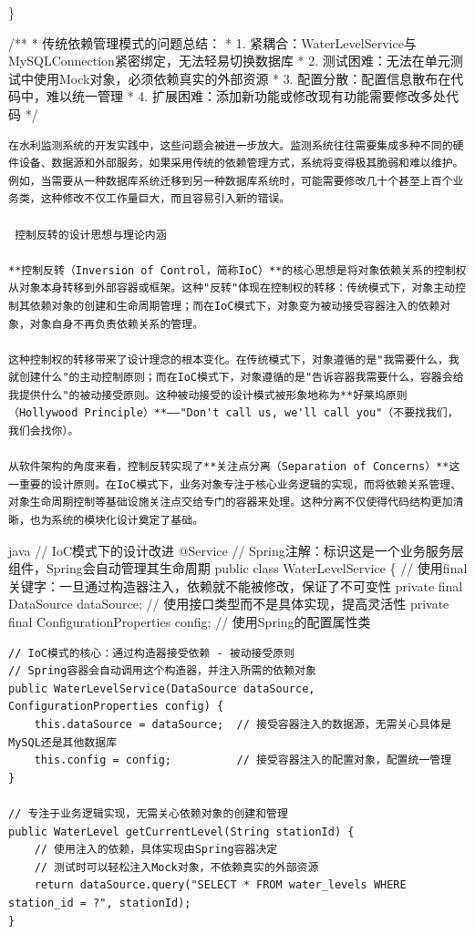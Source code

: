 \}

/** * 传统依赖管理模式的问题总结： * 1. 紧耦合：WaterLevelService与MySQLConnection紧密绑定，无法轻易切换数据库 * 2. 测试困难：无法在单元测试中使用Mock对象，必须依赖真实的外部资源 * 3. 配置分散：配置信息散布在代码中，难以统一管理 * 4. 扩展困难：添加新功能或修改现有功能需要修改多处代码 */

\begin{lstlisting}
在水利监测系统的开发实践中，这些问题会被进一步放大。监测系统往往需要集成多种不同的硬件设备、数据源和外部服务，如果采用传统的依赖管理方式，系统将变得极其脆弱和难以维护。例如，当需要从一种数据库系统迁移到另一种数据库系统时，可能需要修改几十个甚至上百个业务类，这种修改不仅工作量巨大，而且容易引入新的错误。

 控制反转的设计思想与理论内涵

**控制反转（Inversion of Control，简称IoC）**的核心思想是将对象依赖关系的控制权从对象本身转移到外部容器或框架。这种"反转"体现在控制权的转移：传统模式下，对象主动控制其依赖对象的创建和生命周期管理；而在IoC模式下，对象变为被动接受容器注入的依赖对象，对象自身不再负责依赖关系的管理。

这种控制权的转移带来了设计理念的根本变化。在传统模式下，对象遵循的是"我需要什么，我就创建什么"的主动控制原则；而在IoC模式下，对象遵循的是"告诉容器我需要什么，容器会给我提供什么"的被动接受原则。这种被动接受的设计模式被形象地称为**好莱坞原则（Hollywood Principle）**——"Don't call us, we'll call you"（不要找我们，我们会找你）。

从软件架构的角度来看，控制反转实现了**关注点分离（Separation of Concerns）**这一重要的设计原则。在IoC模式下，业务对象专注于核心业务逻辑的实现，而将依赖关系管理、对象生命周期控制等基础设施关注点交给专门的容器来处理。这种分离不仅使得代码结构更加清晰，也为系统的模块化设计奠定了基础。
\end{lstlisting}

java // IoC模式下的设计改进 @Service // Spring注解：标识这是一个业务服务层组件，Spring会自动管理其生命周期 public class WaterLevelService \{ // 使用final关键字：一旦通过构造器注入，依赖就不能被修改，保证了不可变性 private final DataSource dataSource; // 使用接口类型而不是具体实现，提高灵活性 private final ConfigurationProperties config; // 使用Spring的配置属性类

\begin{verbatim}
// IoC模式的核心：通过构造器接受依赖 - 被动接受原则
// Spring容器会自动调用这个构造器，并注入所需的依赖对象
public WaterLevelService(DataSource dataSource, ConfigurationProperties config) {
    this.dataSource = dataSource;  // 接受容器注入的数据源，无需关心具体是MySQL还是其他数据库
    this.config = config;          // 接受容器注入的配置对象，配置统一管理
}

// 专注于业务逻辑实现，无需关心依赖对象的创建和管理
public WaterLevel getCurrentLevel(String stationId) {
    // 使用注入的依赖，具体实现由Spring容器决定
    // 测试时可以轻松注入Mock对象，不依赖真实的外部资源
    return dataSource.query("SELECT * FROM water_levels WHERE station_id = ?", stationId);
}
\end{verbatim}

